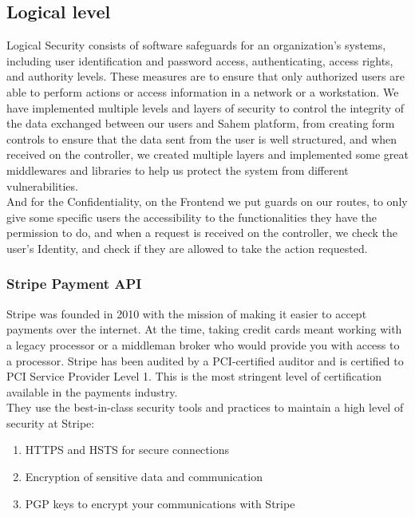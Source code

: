 \subsection{Logical level}
Logical Security consists of software safeguards for an organization's systems, including user identification and password access, authenticating, access rights, and authority levels. These measures are to ensure that only authorized users are able to perform actions or access information in a network or a workstation.
We have implemented multiple levels and layers of security to control the integrity of the data exchanged between our users and Sahem platform, from creating form controls to ensure that the data sent from the user is well structured, and when received on the controller, we created multiple layers and implemented some great middlewares and libraries to help us protect the system from different vulnerabilities.\\
And for the Confidentiality, on the Frontend we put guards on our routes, to only give some specific users the accessibility to the functionalities they have the permission to do, and when a request is received on the controller, we check the user's Identity, and check if they are allowed to take the action requested.
\subsubsection{Stripe Payment API}
Stripe was founded in 2010 with the mission of making it easier to accept payments over the internet. At the time, taking credit cards meant working with a legacy processor or a middleman broker who would provide you with access to a processor.
Stripe has been audited by a PCI-certified auditor and is certified to PCI Service Provider Level 1. This is the most stringent level of certification available in the payments industry. \\
They use the best-in-class security tools and practices to maintain a high level of security at Stripe:
\begin{enumerate}
      \item HTTPS and HSTS for secure connections
      \item Encryption of sensitive data and communication
      \item PGP keys to encrypt your communications with Stripe
\end{enumerate}
